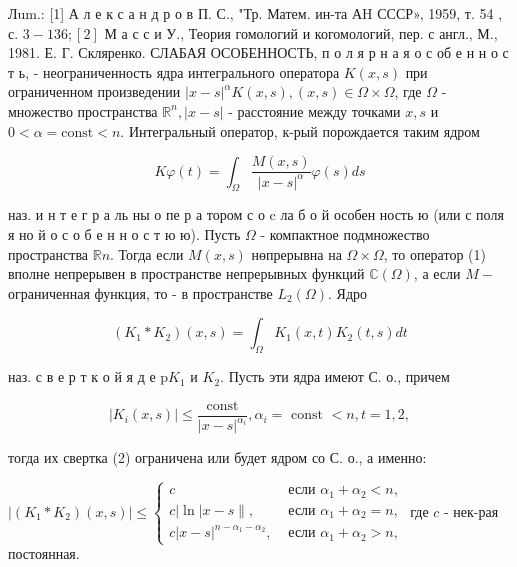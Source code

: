 \documentclass[10pt]{article}
\begin{document}
Лum.: [1] А л е к с а н д р о в П. С., "Тр. Матем. ин-та АH СССР», 1959, т. 54 , с. $3-136 ;[2]$ М а с с и У., Теория гомологий и когомологий, пер. с англ., М., 1981. Е. Г. Скляренко. СЛАБАЯ ОСОБЕННОСТЬ, п о л я р н а я о с об е н н о с т ь, - неограниченность ядра интегрального оператора $K(x, s)$ при ограниченном произведении $|x-s|^{\alpha} K(x, s),(x, s) \in \Omega \times \Omega$, где $\Omega$ - множество пространства $\mathbb{R}^{n},|x-s|$ - расстояние между точками $x, s$ и $0<\alpha=\mathrm{const}<n$. Интегральный оператор, к-рый порождается таким ядром



\[

K \varphi(t)=\int_{\Omega} \frac{M(x, s)}{|x-s|^{\alpha}} \varphi(s) d s

\]



наз. и н т е г р а ль ны о пе р а тором с о c ла б о й особен ность ю (или с поля я но й о с о б е н н о с т ю ю). Пусть $\Omega$ - компактное подмножество пространства $\mathbb{R} n$. Тогда если $M(x, s)$ нөпрерывна на $\Omega \times \Omega$, то оператор (1) вполне непрерывен в пространстве непрерывных функций $\mathbb{C}(\Omega)$, а если $M-$ ограниченная функция, то - в пространстве $L_{2}(\Omega)$. Ядро



\[

\left(K_{1} * K_{2}\right)(x, s)=\int_{\Omega} K_{1}(x, t) K_{2}(t, s) d t

\]



наз. с в е р т к о й я д е $\mathrm{p} K_{1}$ и $K_{2}$. Пусть эти ядра имеют С. о., причем



\[

\left|K_{i}(x, s)\right| \leqslant \frac{\text { const }}{|x-s|^{\alpha_{i}}}, \alpha_{i}=\text { const }<n, t=1,2,

\]



тогда их свертка (2) ограничена или будет ядром со С. о., а именно:



$\left|\left(K_{1} * K_{2}\right)(x, s)\right| \leqslant \begin{cases}c & \text { если } \alpha_{1}+\alpha_{2}<n, \\ c|\ln | x-s \|, & \text { если } \alpha_{1}+\alpha_{2}=n, \\ c|x-s|^{n-\alpha_{1}-\alpha_{2}}, & \text { если } \alpha_{1}+\alpha_{2}>n,\end{cases}$ где $c$ - нек-рая постоянная.
\end{document}

